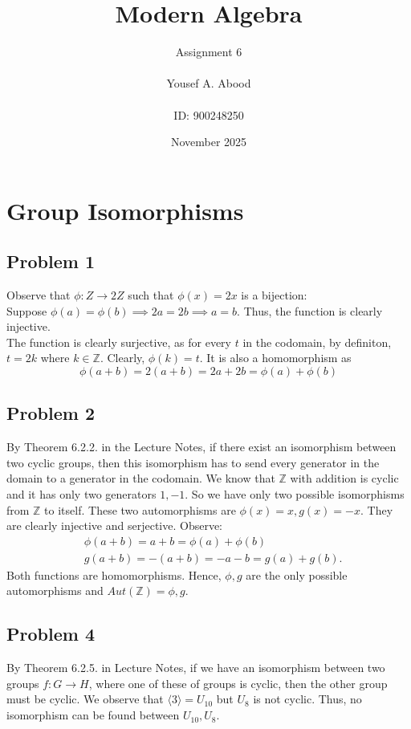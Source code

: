 \documentclass[a4paper,12pt]{article}
\title{Modern Algebra}
\author{Assignment 6\\ \\ Yousef A. Abood\\ \\ ID: 900248250}
\date{November 2025}
\begin{document}
\maketitle
\noindent\makebox[\linewidth]{\rule{15cm}{0.4pt}}
\section{Group Isomorphisms}
\subsection*{Problem 1}
Observe that $\phi : Z \to 2Z$ such that $ \phi (x)=2x$ is a bijection: \\
Suppose $\phi(a)=\phi(b) \implies 2a=2b \implies a=b.$ Thus, the function is clearly injective.\\
The function is clearly surjective, as for every $t$ in the codomain, by definiton, $t=2k$ where $k \in \mathbb{Z}.$ Clearly, $\phi(k)=t.$
It is also a homomorphism as
\[\phi(a+b)=2(a+b)=2a+2b=\phi(a)+\phi(b)\]
\subsection*{Problem 2}
By Theorem 6.2.2. in the Lecture Notes, if there exist an isomorphism between two cyclic groups, then this isomorphism has to send every generator in the domain to a generator in the codomain. We know that $\mathbb{Z}$ with addition is cyclic and it has only two generators $1, -1$. So we have only two possible isomorphisms from $\mathbb{Z}$ to itself. These two automorphisms are $\phi(x)=x, g(x)=-x$. They are clearly injective and serjective.
Observe:
\begin{align*}
    &\phi(a+b)=a+b=\phi(a)+\phi(b)\\
    &g(a+b)=-(a+b)=-a-b=g(a)+g(b).
\end{align*}
Both functions are homomorphisms. Hence, $\phi, g$ are the only possible automorphisms and $Aut(\mathbb{Z})={\phi, g}.$ 
\subsection*{Problem 4}
By Theorem 6.2.5. in Lecture Notes, if we have an isomorphism between two groups $f: G \to H$, where one of these of groups is cyclic, then the other group must be cyclic. We observe that $\langle 3 \rangle=U_{10}$ but $U_{8}$ is not cyclic. Thus, no isomorphism can be found between $U_{10}, U_8.$
\end{document}
